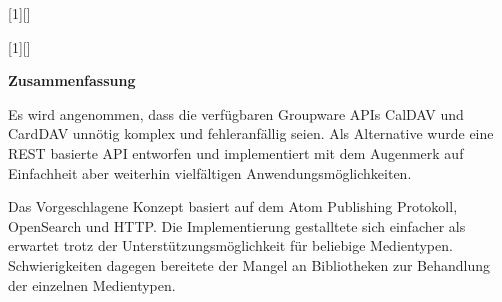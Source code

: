 \documentclass[11pt,a4paper,headsepline,twoside]{scrartcl}		%
\begin{document}
[1][]
  {\lstset{language=Java,float=tb,#1}}%
  {} %

[1][]
  {\lstset{float=tb,#1}}%
  {} %

\lstset{ %
  float=tb,
  frame=single, %
  captionpos=b,
         basicstyle=\footnotesize\ttfamily, %
         numberstyle=\tiny,          %
    numbersep=5pt,              %
    tabsize=2,                  %
    extendedchars=true,         %
    breaklines=true,            %
    stringstyle=\ttfamily, %
    showspaces=false,           %
    showtabs=false,             %
    showstringspaces=false      %
}


\cleardoublepage
{}
\setcounter{page}{3} 


\vspace{1cm}
\Large{\textbf{Zusammenfassung}}
\vspace{1cm}
\normalsize{}

Es wird angenommen, dass die verfügbaren Groupware APIs CalDAV und CardDAV
unnötig komplex und fehleranfällig seien. Als Alternative wurde eine REST
basierte API entworfen und implementiert mit dem Augenmerk auf Einfachheit aber
weiterhin vielfältigen Anwendungsmöglichkeiten.

Das Vorgeschlagene Konzept basiert auf dem Atom Publishing Protokoll, OpenSearch
und HTTP. Die Implementierung gestalltete sich einfacher als erwartet trotz der
Unterstützungsmöglichkeit für beliebige Medientypen. Schwierigkeiten dagegen
bereitete der Mangel an Bibliotheken zur Behandlung der einzelnen Medientypen.
\end{document}

